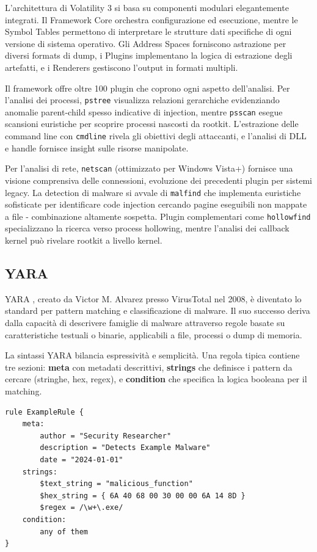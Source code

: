 L'architettura di Volatility 3 si basa su componenti modulari elegantemente integrati. Il Framework Core orchestra configurazione ed esecuzione, mentre le Symbol Tables permettono di interpretare le strutture dati specifiche di ogni versione di sistema operativo. Gli Address Spaces forniscono astrazione per diversi formats di dump, i Plugins implementano la logica di estrazione degli artefatti, e i Renderers gestiscono l'output in formati multipli.

Il framework offre oltre 100 plugin che coprono ogni aspetto dell'analisi. Per l'analisi dei processi, \texttt{pstree} visualizza relazioni gerarchiche evidenziando anomalie parent-child spesso indicative di injection, mentre \texttt{psscan} esegue scansioni euristiche per scoprire processi nascosti da rootkit. L'estrazione delle command line con \texttt{cmdline} rivela gli obiettivi degli attaccanti, e l'analisi di DLL e handle fornisce insight sulle risorse manipolate.

Per l'analisi di rete, \texttt{netscan} (ottimizzato per Windows Vista+) fornisce una visione comprensiva delle connessioni, evoluzione dei precedenti plugin per sistemi legacy. La detection di malware si avvale di \texttt{malfind} che implementa euristiche sofisticate per identificare code injection cercando pagine eseguibili non mappate a file - combinazione altamente sospetta. Plugin complementari come \texttt{hollowfind} specializzano la ricerca verso process hollowing, mentre l'analisi dei callback kernel può rivelare rootkit a livello kernel.

\subsection{YARA}

YARA \cite{yara2024}, creato da Victor M. Alvarez presso VirusTotal nel 2008, è diventato lo standard per pattern matching e classificazione di malware. Il suo successo deriva dalla capacità di descrivere famiglie di malware attraverso regole basate su caratteristiche testuali o binarie, applicabili a file, processi o dump di memoria.

La sintassi YARA bilancia espressività e semplicità. Una regola tipica contiene tre sezioni: \textbf{meta} con metadati descrittivi, \textbf{strings} che definisce i pattern da cercare (stringhe, hex, regex), e \textbf{condition} che specifica la logica booleana per il matching. 

\begin{verbatim}
rule ExampleRule {
    meta:
        author = "Security Researcher"
        description = "Detects Example Malware"
        date = "2024-01-01" 
    strings:
        $text_string = "malicious_function"
        $hex_string = { 6A 40 68 00 30 00 00 6A 14 8D }
        $regex = /\w+\.exe/
    condition:
        any of them
}
\end{verbatim}

